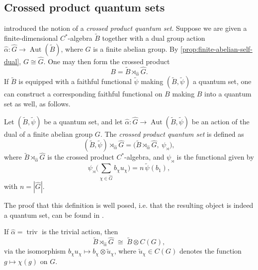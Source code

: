 \subsection{Crossed product quantum sets}
\label{subsec:crossed-product-quantum-sets}

\textcite{tobolski26} introduced the notion of a \emph{crossed product
quantum set}. Suppose we are given a finite-dimensional
\( C^{*} \)-algebra \( \widetilde{B} \) together with a dual group action
\( \widehat\alpha \colon \widehat{G} \to
\operatorname{Aut}(\widetilde{B}) \), where
\( G \) is a finite abelian group. By
\ref{prop:finite-abelian-self-dual}, \( G \cong \widehat{G} \). One may
then form the crossed
product
\[
    B = \widetilde{B} \rtimes_{\widehat\alpha} \widehat{G}.
\]
If \( \widetilde{B} \) is equipped with a faithful functional
\( \widetilde\psi \) making \( (\widetilde{B}, \widetilde\psi) \) a
quantum set, one
can construct a corresponding faithful functional on \( B \) making
\( B \) into a quantum set as well, as follows.

\begin{definition}
    \label{def:crossed-product-quantum-set}
    Let \( (\widetilde{B}, \widetilde\psi) \) be a quantum set, and let
    \( \widehat\alpha \colon \widehat{G} \to \operatorname{Aut}(\widetilde{B},
    \widetilde\psi) \)
    be an action of the dual of a finite abelian group \( G \). The
    \emph{crossed product quantum set} is defined as
    \[
        (\widetilde{B}, \widetilde\psi) \rtimes_{\widehat\alpha} \widehat{G}
        = \big( \widetilde{B} \rtimes_{\widehat\alpha}
        \widehat{G},\ \psi_\rtimes \big),
    \]
    where \( \widetilde{B} \rtimes_{\widehat\alpha} \widehat{G} \) is
    the crossed
    product \( C^{*} \)-algebra, and \( \psi_\rtimes \) is the
    functional given by
    \[
        \psi_\rtimes\Big( \sum_{\chi \in \widehat{G}} b_\chi u_\chi \Big)
        = n\, \widetilde\psi(b_1),
    \]
    with \( n = |\widehat{G}| \).
\end{definition}

The proof that this definition is well posed, i.e. that the resulting
object is indeed a quantum set, can be found in
\textcite[Proposition~3.4]{tobolski26}.

\begin{example}[Example 3.5]
    \label{example:crossed-product-trivial-action}
    If \( \widehat\alpha = \operatorname{triv} \) is the trivial action, then
    \[
        \widetilde{B} \rtimes_{\widehat\alpha} \widehat{G} \;\cong\;
        \widetilde{B} \otimes C(G),
    \]
    via the isomorphism \( b_\chi u_\chi \mapsto b_\chi \otimes
    \widetilde u_\chi \),
    where \( \widetilde u_\chi \in C(G) \) denotes the function
    \( g \mapsto \chi(g) \) on \( G \).
\end{example}


